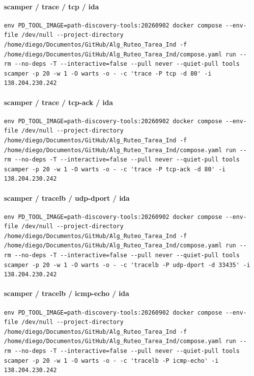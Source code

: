 \paragraph{scamper / trace / tcp / ida}
\begin{lstlisting}
env PD_TOOL_IMAGE=path-discovery-tools:20260902 docker compose --env-file /dev/null --project-directory /home/diego/Documentos/GitHub/Alg_Ruteo_Tarea_Ind -f /home/diego/Documentos/GitHub/Alg_Ruteo_Tarea_Ind/compose.yaml run --rm --no-deps -T --interactive=false --pull never --quiet-pull tools scamper -p 20 -w 1 -O warts -o - -c 'trace -P tcp -d 80' -i 138.204.230.242
\end{lstlisting}
\paragraph{scamper / trace / tcp-ack / ida}
\begin{lstlisting}
env PD_TOOL_IMAGE=path-discovery-tools:20260902 docker compose --env-file /dev/null --project-directory /home/diego/Documentos/GitHub/Alg_Ruteo_Tarea_Ind -f /home/diego/Documentos/GitHub/Alg_Ruteo_Tarea_Ind/compose.yaml run --rm --no-deps -T --interactive=false --pull never --quiet-pull tools scamper -p 20 -w 1 -O warts -o - -c 'trace -P tcp-ack -d 80' -i 138.204.230.242
\end{lstlisting}
\paragraph{scamper / tracelb / udp-dport / ida}
\begin{lstlisting}
env PD_TOOL_IMAGE=path-discovery-tools:20260902 docker compose --env-file /dev/null --project-directory /home/diego/Documentos/GitHub/Alg_Ruteo_Tarea_Ind -f /home/diego/Documentos/GitHub/Alg_Ruteo_Tarea_Ind/compose.yaml run --rm --no-deps -T --interactive=false --pull never --quiet-pull tools scamper -p 20 -w 1 -O warts -o - -c 'tracelb -P udp-dport -d 33435' -i 138.204.230.242
\end{lstlisting}
\paragraph{scamper / tracelb / icmp-echo / ida}
\begin{lstlisting}
env PD_TOOL_IMAGE=path-discovery-tools:20260902 docker compose --env-file /dev/null --project-directory /home/diego/Documentos/GitHub/Alg_Ruteo_Tarea_Ind -f /home/diego/Documentos/GitHub/Alg_Ruteo_Tarea_Ind/compose.yaml run --rm --no-deps -T --interactive=false --pull never --quiet-pull tools scamper -p 20 -w 1 -O warts -o - -c 'tracelb -P icmp-echo' -i 138.204.230.242
\end{lstlisting}
